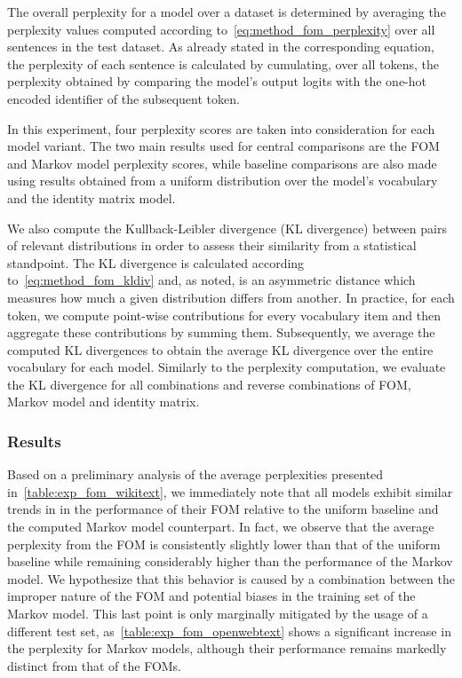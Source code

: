 The overall perplexity for a model over a dataset is determined by averaging the perplexity values computed according to~\cref{eq:method_fom_perplexity} over all sentences in the test dataset.
As already stated in the corresponding equation, the perplexity of each sentence is calculated by cumulating, over all tokens, the perplexity obtained by comparing the model's output logits with the one-hot encoded identifier of the subsequent token.

In this experiment, four perplexity scores are taken into consideration for each model variant.
The two main results used for central comparisons are the FOM and Markov model perplexity scores, while baseline comparisons are also made using results obtained from a uniform distribution over the model's vocabulary and the identity matrix model.

We also compute the Kullback-Leibler divergence (KL divergence) between pairs of relevant distributions in order to assess their similarity from a statistical standpoint.
The KL divergence is calculated according to~\cref{eq:method_fom_kldiv} and, as noted, is an asymmetric distance which measures how much a given distribution differs from another.
In practice, for each token, we compute point-wise contributions for every vocabulary item and then aggregate these contributions by summing them.
Subsequently, we average the computed KL divergences to obtain the average KL divergence over the entire vocabulary for each model.
Similarly to the perplexity computation, we evaluate the KL divergence for all combinations and reverse combinations of FOM, Markov model and identity matrix.

\subsubsection{Results}

Based on a preliminary analysis of the average perplexities presented in~\cref{table:exp_fom_wikitext}, we immediately note that all models exhibit similar trends in in the performance of their FOM relative to the uniform baseline and the computed Markov model counterpart.
In fact, we observe that the average perplexity from the FOM is consistently slightly lower than that of the uniform baseline while remaining considerably higher than the performance of the Markov model.
We hypothesize that this behavior is caused by a combination between the improper nature of the FOM and potential biases in the training set of the Markov model.
This last point is only marginally mitigated by the usage of a different test set, as~\cref{table:exp_fom_openwebtext} shows a significant increase in the perplexity for Markov models, although their performance remains markedly distinct from that of the FOMs.


